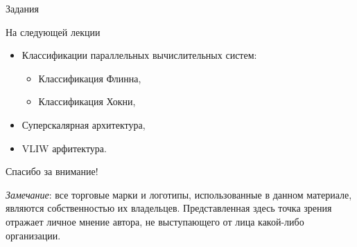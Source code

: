 \begin{frame}{Задания}
\end{frame}

\begin{frame}{На следующей лекции}
\begin{itemize}
    \item Классификации параллельных вычислительных систем:
    \begin{itemize}
        \item Классификация Флинна,
        \item Классификация Хокни,
    \end{itemize}
    \item Суперскалярная архитектура,
    \item VLIW арфитектура.
\end{itemize}
\end{frame}

\begin{frame}

{\huge{Спасибо за внимание!}\par}

\vfill

\tiny{\textit{Замечание}: все торговые марки и логотипы, использованные в данном материале, являются собственностью их владельцев. Представленная здесь точка зрения отражает личное мнение автора, не выступающего от лица какой-либо организации.}

\end{frame}



